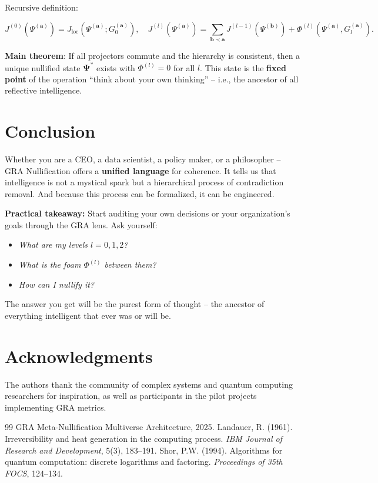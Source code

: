 \documentclass[12pt]{article}
\begin{document}
Recursive definition:

\[
J^{(0)}(\Psi^{(\mathbf{a})}) = J_{\text{loc}}(\Psi^{(\mathbf{a})}; G_0^{(\mathbf{a})}), \quad
J^{(l)}(\Psi^{(\mathbf{a})}) = \sum_{\mathbf{b}\prec\mathbf{a}} J^{(l-1)}(\Psi^{(\mathbf{b})}) + \Phi^{(l)}(\Psi^{(\mathbf{a})}, G_l^{(\mathbf{a})}) .
\]

\textbf{Main theorem}: If all projectors commute and the hierarchy is consistent, then a unique nullified state \( \mathbf{\Psi}^* \) exists with \( \Phi^{(l)} = 0 \) for all \( l \). This state is the \textbf{fixed point} of the operation ``think about your own thinking'' – i.e., the ancestor of all reflective intelligence.

\section{Conclusion}

Whether you are a CEO, a data scientist, a policy maker, or a philosopher – GRA Nullification offers a \textbf{unified language} for coherence. It tells us that intelligence is not a mystical spark but a hierarchical process of contradiction removal. And because this process can be formalized, it can be engineered.

\textbf{Practical takeaway:} Start auditing your own decisions or your organization's goals through the GRA lens. Ask yourself:
\begin{itemize}
    \item \textit{What are my levels \( l=0,1,2 \)?}
    \item \textit{What is the foam \( \Phi^{(l)} \) between them?}
    \item \textit{How can I nullify it?}
\end{itemize}
The answer you get will be the purest form of thought – the ancestor of everything intelligent that ever was or will be.

\section*{Acknowledgments}
The authors thank the community of complex systems and quantum computing researchers for inspiration, as well as participants in the pilot projects implementing GRA metrics.

\begin{thebibliography}{99}
 GRA Meta-Nullification Multiverse Architecture, 2025.
 Landauer, R. (1961). Irreversibility and heat generation in the computing process. \textit{IBM Journal of Research and Development}, 5(3), 183–191.
 Shor, P.W. (1994). Algorithms for quantum computation: discrete logarithms and factoring. \textit{Proceedings of 35th FOCS}, 124–134.
\end{thebibliography}
\end{document}
